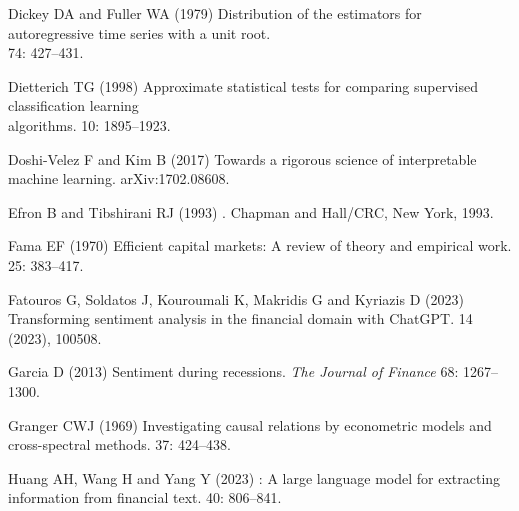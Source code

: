 \documentclass{aims}
\numberwithin{equation}{section}
\begin{document}
\begin{thebibliography}{}
\newblock Dickey DA and Fuller WA (1979)
\newblock Distribution of the estimators for autoregressive time series with a unit root.\\
 74: 427--431. 
  
\newblock  Dietterich TG (1998)
\newblock Approximate statistical tests for comparing supervised classification learning\\
algorithms.
 10: 1895--1923. 

\newblock Doshi-Velez F and Kim B (2017)
\newblock Towards a rigorous science of interpretable machine learning.
\newblock arXiv:1702.08608. 
  
\newblock Efron B and Tibshirani RJ (1993)
.
\newblock Chapman and Hall/CRC, New York, 1993. 

\newblock Fama EF (1970)
\newblock Efficient capital markets: A review of theory and empirical work.
 25: 383--417. 

\newblock Fatouros G, Soldatos J, Kouroumali K, Makridis G and Kyriazis D (2023)
\newblock Transforming sentiment analysis in the financial domain with
  {ChatGPT}.
 14 (2023), 100508. 

\newblock Garcia D (2013)
\newblock Sentiment during recessions. {\em The Journal of Finance} 68: 1267--1300.\\
\newblock  {}

\newblock Granger CWJ (1969)
\newblock Investigating causal relations by econometric models and
  cross-spectral methods.
 37: 424--438. 

\newblock Huang AH, Wang H and Yang Y (2023)
: A large language model for extracting information from financial text.
 40: 806--841. 


\end{thebibliography}
\end{document}
